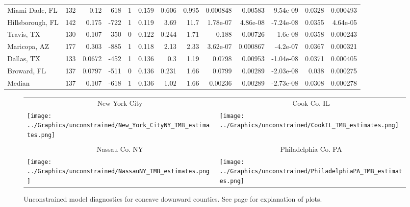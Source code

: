 \documentclass[12pt,letterpaper]{article}
\begin{document}
\begin{sidewaystable}
{\begin{tabular}{lrrrrrrrrrrrr}
 Miami-Dade, FL    &   132 &  0.12   &  -618 &     1 &           0.159 &            0.606 &          0.995 &     0.000848 &     0.00583  &        -9.54e-09 &           0.0328  &        0.000493 \\
 Hillsborough, FL  &   142 &  0.175  &  -722 &     1 &           0.119 &            3.69  &         11.7   &     1.78e-07 &     4.86e-08 &        -7.24e-08 &           0.0355  &        4.64e-05 \\
 Travis, TX        &   130 &  0.107  &  -350 &     0 &           0.122 &            0.244 &          1.71  &     0.188    &     0.00726  &        -1.6e-08  &           0.0358  &        0.000243 \\
 Maricopa, AZ      &   177 &  0.303  &  -885 &     1 &           0.118 &            2.13  &          2.33  &     3.62e-07 &     0.000867 &        -4.2e-07  &           0.0367  &        0.000321 \\
 Dallas, TX        &   133 &  0.0672 &  -452 &     1 &           0.136 &            0.3   &          1.19  &     0.0798   &     0.00953  &        -1.04e-08 &           0.0371  &        0.000405 \\
 Broward, FL       &   137 &  0.0797 &  -511 &     0 &           0.136 &            0.231 &          1.66  &     0.0799   &     0.00289  &        -2.03e-08 &           0.038   &        0.000275 \\
\hline
 Median            &   137 &  0.107  &  -618 &     1 &           0.136 &            1.02  &          1.66  &     0.00236  &     0.00289  &        -2.73e-08 &           0.0308  &        0.000278 \\
\hline
\end{tabular}


}\end{sidewaystable}


\begin{figure}
{\scriptsize
\begin{center}
\begin{tabular}{ll}
\multicolumn{1}{c}{New York City}&\multicolumn{1}{c}{Cook Co. IL}\\
\texttt{[image: ../Graphics/unconstrained/New\_York\_CityNY\_TMB\_estimates.png]}&
\texttt{[image: ../Graphics/unconstrained/CookIL\_TMB\_estimates.png]}\\
\\
\multicolumn{1}{c}{Nassau Co. NY}&\multicolumn{1}{c}{Philadelphia Co.  PA}\\
\texttt{[image: ../Graphics/unconstrained/NassauNY\_TMB\_estimates.png]}&
\texttt{[image: ../Graphics/unconstrained/PhiladelphiaPA\_TMB\_estimates.png]}\\
\end{tabular}
\end{center}
}
\caption{\label{fig:ests1U}
Unconstrained model diagnostics for concave downward counties.
See page \pageref{pp:diagexpl} for explanation of plots.
}
\end{figure}
\end{document}
